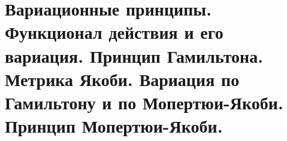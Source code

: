 \section{Вариационные принципы. Функционал действия и его вариация. Принцип Гамильтона. Метрика Якоби. Вариация по Гамильтону и по Мопертюи-Якоби. Принцип Мопертюи-Якоби.}\label{chasec5}



\newpage